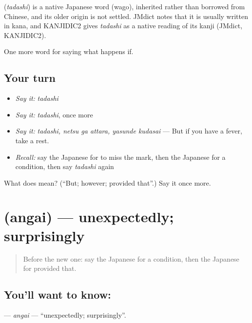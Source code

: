 \begin{cousinweb}
\textbf{} (\emph{tadashi}) is a native Japanese word (wago), inherited rather than borrowed from Chinese, and its older origin is not settled. JMdict notes that it is usually written in kana, and KANJIDIC2 gives \emph{tadashi} as a native reading of its kanji (JMdict, KANJIDIC2).
\end{cousinweb}

\begin{grammarlens}[title={What you've built}]
One more word for saying what happens if.
\end{grammarlens}

\subsection*{Your turn}
\begin{itemize}
\raggedright
  \item \emph{Say it:} \emph{tadashi}
  \item \emph{Say it:} \emph{tadashi}, once more
  \item \emph{Say it:} \emph{tadashi, netsu ga attara, yasunde kudasai} — But if you have a fever, take a rest.
  \item \emph{Recall:} say the Japanese for to miss the mark, then the Japanese for a condition, then say \emph{tadashi} again
\end{itemize}

\begin{tcolorbox}[breakable,colback=teal!4,colframe=teal!35!black,title={Before you move on}]
What does  mean? (\textquotedblleft{}But; however; provided that\textquotedblright{}.) Say it once more.
\end{tcolorbox}
\section[\texorpdfstring{\ja{あんがい} (angai)}{あんがい (angai)}]{ (angai) — unexpectedly; surprisingly}

\label{lesson:JA-C356-angai}



\begin{quote}
Before the new one: say the Japanese for a condition, then the Japanese for provided that.
\end{quote}

\subsection*{You'll want to know: }
\textbf{} — \emph{angai} — \textquotedblleft{}unexpectedly; surprisingly\textquotedblright{}.

